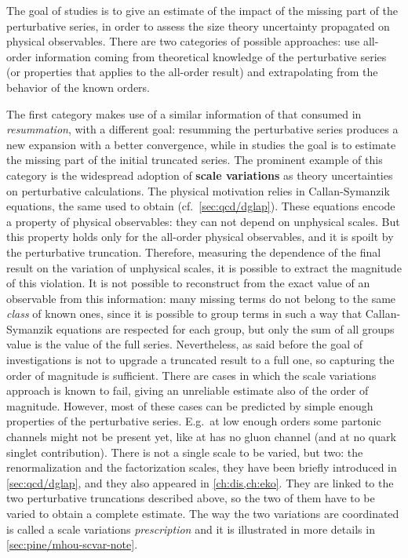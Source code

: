 
The goal of \mhou studies is to give an estimate of the impact of the missing
part of the perturbative series, in order to assess the size theory uncertainty
propagated on physical observables.
%
There are two categories of possible approaches: use all-order information
coming from theoretical knowledge of the perturbative series (or properties
that applies to the all-order result) and extrapolating from the behavior of
the known orders.

The first category makes use of a similar information of that consumed in
\textit{resummation}, with a different goal: resumming the perturbative series
produces a new expansion with a better convergence, while in \mhou studies the
goal is to estimate the missing part of the initial truncated series.
%
The prominent example of this category is the widespread adoption of
\textbf{scale variations} as theory uncertainties on perturbative calculations.
The physical motivation relies in Callan-Symanzik equations, the same used to
obtain \dglap (cf.\ \cref{sec:qcd/dglap}).
%
These equations encode a property of physical observables: they can not depend
on unphysical scales.
But this property holds only for the all-order physical observables, and it is
spoilt by the perturbative truncation.
Therefore, measuring the dependence of the final result on the variation of
unphysical scales, it is possible to extract the magnitude of this violation. 
%
It is not possible to reconstruct from the exact value of an observable from
this information: many missing terms do not belong to the same \textit{class}
of known ones, since it is possible to group terms in such a way that
Callan-Symanzik equations are respected for each group, but only the sum of all
groups value is the value of the full series.
%
Nevertheless, as said before the goal of \mhou investigations is not to upgrade
a truncated result to a full one, so capturing the order of magnitude is
sufficient.
%
There are cases in which the scale variations approach is known to fail, giving
an unreliable estimate also of the order of magnitude.
However, most of these cases can be predicted by simple enough properties of
the perturbative series.
E.g.\ at low enough orders some partonic channels might not be present yet,
like \dis at \lo has no gluon channel (and at \nlo no quark singlet
contribution).
%
There is not a single scale to be varied, but two: the renormalization and the
factorization scales, they have been briefly introduced in
\cref{sec:qcd/dglap}, and they also appeared in \cref{ch:dis,ch:eko}.
They are linked to the two perturbative truncations described above, so the two
of them have to be varied to obtain a complete estimate.
The way the two variations are coordinated is called a scale variations
\textit{prescription} and it is illustrated in more details in
\cref{sec:pine/mhou-scvar-note}. 

